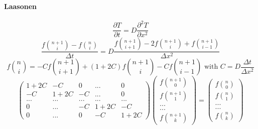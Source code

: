 \documentclass[12pt, a4paper]{report}
\begin{document}
\begin{appendix}
\paragraph{Laasonen}
\begin{equation}\frac{\partial T}{\partial t} = D\frac{\partial^2T }{\partial x^2}
\end{equation} 
\begin{equation}\frac{f\binom{n+1}{i} - f\binom{n}{i}}{\Delta t} = D\frac{f\binom{n+1}{i+1} - 2f\binom{n+1}{i}+ f\binom{n+1}{i-1}}{\Delta x^{2}}
\end{equation} 
\begin{equation}f\binom{n}{i} = -Cf\binom{n+1}{i+1}+(1+2C)f\binom{n+1}{i}-Cf\binom{n+1}{i-1}
   \text{ with }
C = D\frac{\Delta t}{\Delta x^{2}}
\end{equation}
\begin{equation}
\begin{pmatrix}
1+2C & -C & 0 & ... & 0\\
-C & 1+2C & -C& ... & 0\\
...&...&...&...&...\\
 0 & ...& -C &1+2C & -C \\
0 & ... &  0& -C & 1+2C
\end{pmatrix}
\begin{pmatrix}
f\binom{n+1}{0}\\
f\binom{n+1}{1}\\
...\\
...\\
f\binom{n+1}{k}
\end{pmatrix}
=
\begin{pmatrix}
f\binom{n}{0}\\
f\binom{n}{1}\\
...\\
...\\
f\binom{n}{k}
\end{pmatrix}
\end{equation}

\end{appendix}
\end{document}
